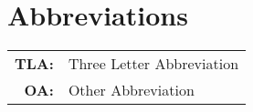 \renewcommand{\baselinestretch}{1}
\chapter{Abbreviations}

\begin{tabular}{rl}
  \vspace{0.1em} \textbf{TLA:} & Three Letter Abbreviation \\
  \vspace{0.1em} \textbf{OA:} & Other Abbreviation\\
\end{tabular}


